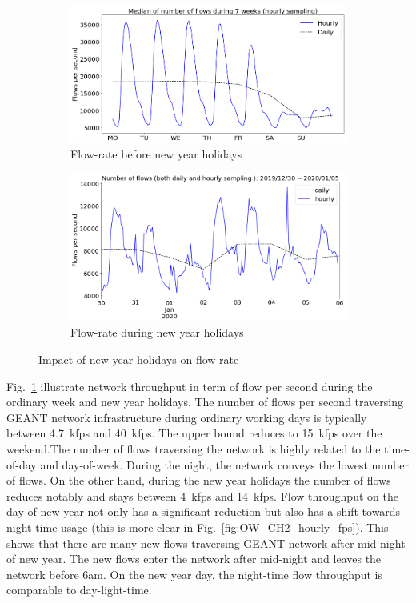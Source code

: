 \documentclass[10pt, journal, letterpaper]{IEEEtran}
\newcommand\linearFigSze{0.48}
\begin{document}
\begin{figure}
    \begin{subfigure}{\linearFigSze\textwidth}
          \centering
          \includegraphics[width=\columnwidth]{img/BCH_flowrate.png}
          \caption{Flow-rate before new year holidays}
          \label{fig:BCH_fps}
    \end{subfigure}
    \begin{subfigure}{\linearFigSze\textwidth}
          \centering
          \includegraphics[width=\columnwidth]{img/CH2_flowrate.png}
          \caption{Flow-rate during new year holidays}
          \label{fig:CH_fps}
    \end{subfigure}
    \caption{Impact of new year holidays on flow rate}
    \label{fig:flowrate_BCH_CH}
\end{figure}
Fig.~\ref{fig:BCH_fps} illustrate network throughput in term of flow per second during the ordinary week and new year holidays. The number of flows per second traversing GEANT network infrastructure during ordinary working days is typically between 4.7~kfps and 40~kfps. The upper bound reduces to 15~kfps over the weekend.The number of flows traversing the network is highly related to the time-of-day and day-of-week. During the night, the network conveys the lowest number of flows. 
On the other hand, during the new year holidays the number of flows reduces notably and stays between 4~kfps and 14~kfps. Flow throughput on the day of new year not only has a significant reduction but also has a shift towards night-time usage (this is more clear in Fig.~\ref{fig:OW_CH2_hourly_fps}). This shows that there are many new flows traversing GEANT network after mid-night of new year. The new flows enter the network after mid-night and leaves the network before 6am. On the new year day, the night-time flow throughput is comparable to day-light-time.
\end{document}
